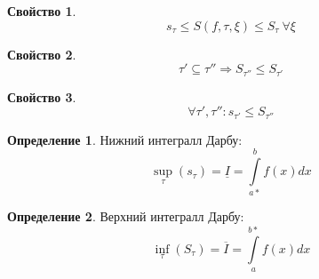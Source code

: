 \documentclass[a4paper]{article}
\theoremstyle{definition}
\newtheorem*{definition*}{Определение}
\newtheorem{property}{Свойство}
\numberwithin{theorem}{subsection}
\numberwithin{lemma}{subsection}
\numberwithin{definition}{subsection}
\numberwithin{comment*}{subsection}
\numberwithin{consequence}{subsection}
\numberwithin{property}{subsection}
\begin{document}
\begin{property}
 $$ s_\tau \leq S(f, \tau, \xi) \leq S_\tau \  \forall{\xi}$$
\end{property}
\begin{property}
 $$ \tau' \subseteq \tau'' \Rightarrow S_{\tau''} \leq S_{\tau'}$$
\end{property}
\begin{property}
 $$\forall{\tau', \tau''}: s_{\tau'} \leq S_{\tau''} $$
\end{property}
\begin{definition*}
 Нижний интегралл Дарбу:
 $$ \sup_{\tau} (s_\tau) = \underline{I} = \int\limits_{a*}^b f(x)dx$$
\end{definition*}
\begin{definition*}
 Верхний интегралл Дарбу:
 $$ \inf_{\tau} (S_\tau) = \overline{I} = \int\limits_{a}^{b*} f(x)dx$$
\end{definition*}
\end{document}
